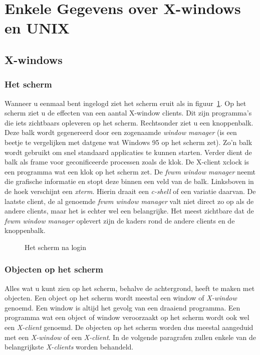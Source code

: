 \section{Enkele Gegevens over X-windows en UNIX}
\label{UNIX en X-windows}
\subsection{X-windows}
\subsubsection{Het scherm}
\label{Het scherm}

Wanneer u eenmaal bent ingelogd ziet het scherm eruit
als in figuur~\ref{display_look}.
Op het scherm ziet u de effecten van een aantal X-window clients.
Dit zijn programma's die iets zichtbaars opleveren op het scherm.
Rechtsonder ziet u een knoppenbalk.
Deze balk wordt
gegenereerd door een zogenaamde {\em window manager}
(is een beetje te vergelijken met
datgene wat Windows 95 op het scherm zet).
Zo'n balk wordt gebruikt om snel standaard applicaties te kunnen starten.
Verder dient de balk als frame voor ge{\ii}conificeerde
processen zoals de klok.
De X-client xclock is een programma wat een klok op het scherm zet.
De {\em fvwm window manager} neemt die
grafische informatie en stopt deze binnen een veld van de balk.
Linksboven in de hoek verschijnt een {\em xterm}.
Hierin draait een {\em c-shell} of een variatie daarvan.
De laatste client,
de al genoemde {\em fvwm window manager} valt niet direct zo op als de
andere clients,
maar het is echter wel een belangrijke.
Het meest zichtbare dat de {\em fvwm window manager} oplevert
zijn de kaders rond de andere clients en de knoppenbalk.

\begin{figure}[bth]
\centerline{}
\caption{Het scherm na login
\label{display_look}}
\end{figure}

\subsubsection{Objecten op het scherm}
\label{Objecten op het scherm}
Alles wat u kunt zien op het scherm, behalve de achtergrond, heeft te
maken met objecten. Een object op het scherm wordt meestal een window
of {\em X-window} genoemd.  Een window is altijd het gevolg van een
draaiend programma.  Een programma wat een object of window
veroorzaakt op het scherm wordt ook wel een {\em X-client} genoemd.
De objecten op het scherm worden dus meestal aangeduid met een {\em
X-window} of een {\em X-client}.  In de volgende paragrafen zullen
enkele van de belangrijkste {\em X-clients} worden behandeld.

